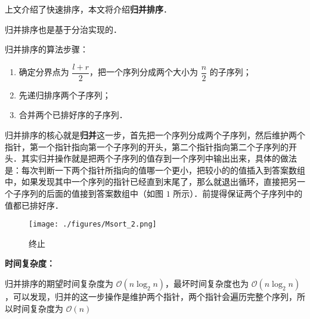 
上文介绍了快速排序，本文将介绍\textbf{归并排序}．

归并排序也是基于分治实现的．

归并排序的算法步骤：
\begin{enumerate}
\item 确定分界点为 $\dfrac{l + r}{2}$，把一个序列分成两个大小为 $\dfrac{n}{2}$ 的子序列；
\item 先递归排序两个子序列；
\item 合并两个已排好序的子序列．
\end{enumerate}

归并排序的核心就是\textbf{归并}这一步，首先把一个序列分成两个子序列，然后维护两个指针，第一个指针指向第一个子序列的开头，第二个指针指向第二个子序列的开头．其实归并操作就是把两个子序列的值存到一个序列中输出出来，具体的做法是：每次判断一下两个指针所指向的值哪一个更小，把较小的的值插入到答案数组中，如果发现其中一个序列的指针已经直到末尾了，那么就退出循环，直接把另一个子序列的后面的值接到答案数组中（如图 $1$ 所示）．前提得保证两个子序列中的值都已排好序．

\begin{figure}[ht]
\centering
\texttt{[image: ./figures/Msort\_2.png]}
\caption{终止} \label{Msort_fig2}
\end{figure}

\textbf{时间复杂度：}

归并排序的期望时间复杂度为 $\mathcal{O}(n \log_2 n)$，最坏时间复杂度也为 $\mathcal{O}(n \log_2 n)$，可以发现，归并的这一步操作是维护两个指针，两个指针会遍历完整个序列，所以时间复杂度为 $\mathcal{O}(n)$